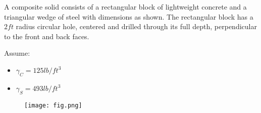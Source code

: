 
A composite solid consists of a rectangular block of lightweight concrete and a triangular wedge of steel with dimensions as shown. The rectangular block has a $2 ft$ radius circular hole, centered and drilled through its full depth, perpendicular to the front and back faces.

Assume:
\begin{itemize}
  \item $\gamma_C = 125 lb/ft^3$
  \item $\gamma_S = 493 lb/ft^3$
\end{itemize}

\begin{figure}[ht!]
  \centering
  \texttt{[image: fig.png]}
\end{figure}

\iftoggle{flagSoln}{%
\vspace{.5cm}
\rule{\textwidth}{.4pt}
\vspace{.5cm}
\textbf{Solution:}
\begin{figure}[ht!]
  \centering
  \texttt{[image: soln.png]}
\end{figure}
}{%
}%
